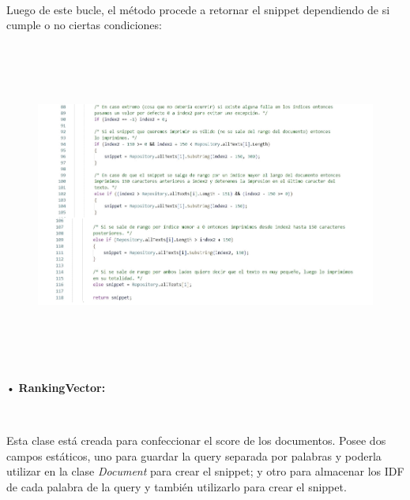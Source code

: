 \documentclass{article}
\begin{document}
\


Luego de este bucle, el método procede a retornar el snippet dependiendo de si cumple
o no ciertas condiciones:


\ 


\begin{figure}[h]
	\begin{center}
		\includegraphics[width = 14cm, height = 9cm]{img5.png}
	\end{center}
\end{figure}


\


• \textbf{RankingVector:}


\


Esta clase está creada para confeccionar el score de los documentos. Posee dos campos
estáticos, uno para guardar la query separada por palabras y poderla utilizar en la clase
{\textit{Document}} para crear el snippet; y otro para almacenar los IDF de cada palabra de la query y
también utilizarlo para crear el snippet.
\end{document}
